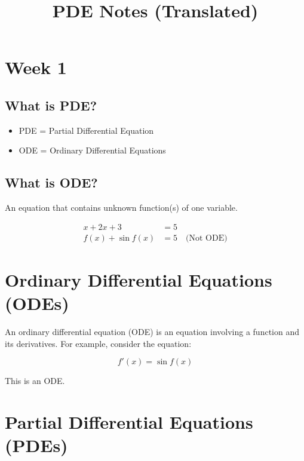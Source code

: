 \documentclass[11pt]{article}
\title{PDE Notes (Translated)}
\date{}
\begin{document}
\maketitle




\section*{Week 1}

\subsection*{What is PDE?}

\begin{itemize}
    \item PDE = Partial Differential Equation
    \item ODE = Ordinary Differential Equations
\end{itemize}

\subsection*{What is ODE?}

An equation that contains unknown function(s) of one variable.

\begin{align*}
    x + 2x + 3 &= 5 \\
    f(x) + \sin f(x) &= 5 \quad \text{(Not ODE)}
\end{align*}



\section*{Ordinary Differential Equations (ODEs)}

An ordinary differential equation (ODE) is an equation involving a function and its derivatives. For example, consider the equation:

\begin{equation}
f'(x) = \sin f(x)
\end{equation}

This is an ODE.

\section*{Partial Differential Equations (PDEs)}
\end{document}
